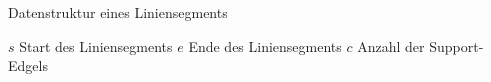 \begin{algorithm}[ht]
\caption{Datenstruktur eines Liniensegments}
\label{alg:datastructure-line}
	\begin{algorithmic}[1]
		\State $s$
		\Comment Start des Liniensegments
		\State $e$
		\Comment Ende des Liniensegments
		\State $c$
		\Comment Anzahl der Support-Edgels
	\end{algorithmic}
\end{algorithm}